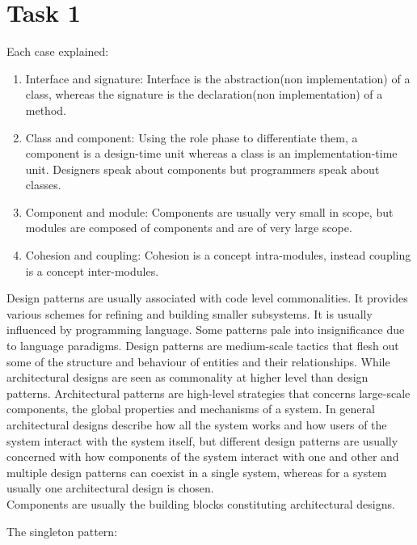 \chapter{Task 1}
\begin{parlist}
	\item Each case explained:
		\begin{enumerate}
			\item Interface and signature: Interface is the abstraction(non implementation) of a class, whereas the signature is the declaration(non implementation) of a method. \cite{deitel2009java}
			\item Class and component: Using the role phase to differentiate them, a component is a design-time unit whereas a class is an implementation-time unit. Designers speak about components but programmers speak about classes.\cite{stackexchangeThereDifference}
			\item Component and module: Components are usually very small in scope, but modules are composed of components and are of very large scope. \cite{stackexchangeThereDifference}
			\item Cohesion and coupling: Cohesion is a concept intra-modules, instead coupling is a concept inter-modules. \cite{geeksforgeeksSoftwareEngineering}
		\end{enumerate}
		\item Design patterns are usually associated with code level commonalities. It provides various schemes for refining and building smaller subsystems. It is usually influenced by programming language. Some patterns pale into insignificance due to language paradigms. Design patterns are medium-scale tactics that flesh out some of the structure and behaviour of entities and their relationships. While architectural designs are seen as commonality at higher level than design patterns. Architectural patterns are high-level strategies that concerns large-scale components, the global properties and mechanisms of a system.\cite{stackoverflowWhatsDifference} In general architectural designs describe how all the system works and how users of the system interact with the system itself, but different design patterns are usually concerned with how components of the system interact with one and other and multiple design patterns can coexist in a single system, whereas for a system usually one architectural design is chosen. \\ Components are usually the building blocks constituting architectural designs. %
		\item The singleton pattern:

\end{parlist}
